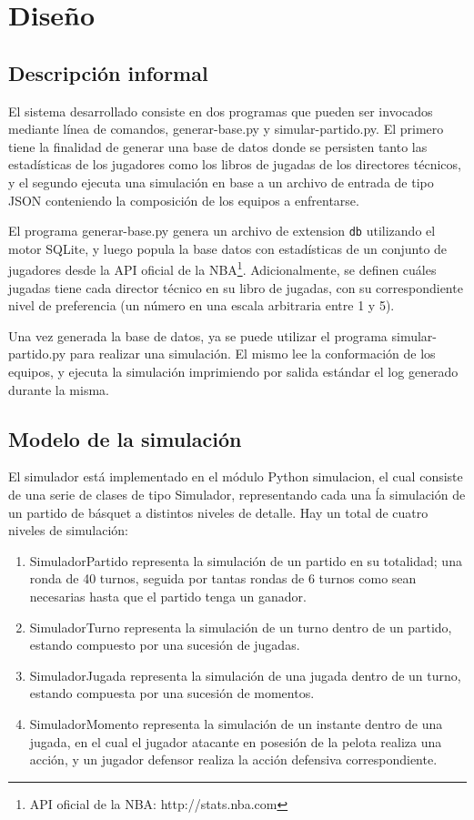 \section{Dise\~no}

\subsection{Descripci\'on informal}

El sistema desarrollado consiste en dos programas que pueden ser invocados mediante línea de comandos, \textsf{generar-base.py} y \textsf{simular-partido.py}. El primero tiene la finalidad de generar una base de datos donde se persisten tanto las estadísticas de los jugadores como los libros de jugadas de los directores técnicos, y el segundo ejecuta una simulación en base a un archivo de entrada de tipo JSON conteniendo la composición de los equipos a enfrentarse.

El programa \textsf{generar-base.py} genera un archivo de extension \texttt{db} utilizando el motor SQLite, y luego popula la base datos con estadísticas de un conjunto de jugadores desde la API oficial de la NBA\footnote{API oficial de la NBA: http://stats.nba.com}. Adicionalmente, se definen cuáles jugadas tiene cada director técnico en su libro de jugadas, con su correspondiente nivel de preferencia (un número en una escala arbitraria entre 1 y 5).

Una vez generada la base de datos, ya se puede utilizar el programa \textsf{simular-partido.py} para realizar una simulación. El mismo lee la conformación de los equipos, y ejecuta la simulación imprimiendo por salida estándar el log generado durante la misma.

\subsection{Modelo de la simulación}

El simulador está implementado en el módulo Python \textsf{simulacion}, el cual consiste de una serie de clases de tipo Simulador, representando cada una ĺa simulación de un partido de básquet a distintos niveles de detalle. Hay un total de cuatro niveles de simulación:

\begin{enumerate}
  \item \textsf{SimuladorPartido} representa la simulación de un partido en su totalidad; una ronda de 40 turnos, seguida por tantas rondas de 6 turnos como sean necesarias hasta que el partido tenga un ganador.
  \item \textsf{SimuladorTurno} representa la simulación de un turno dentro de un partido, estando compuesto por una sucesión de jugadas.
  \item \textsf{SimuladorJugada} representa la simulación de una jugada dentro de un turno, estando compuesta por una sucesión de momentos.
  \item \textsf{SimuladorMomento} representa la simulación de un instante dentro de una jugada, en el cual el jugador atacante en posesión de la pelota realiza una acción, y un jugador defensor realiza la acción defensiva correspondiente.
\end{enumerate}


